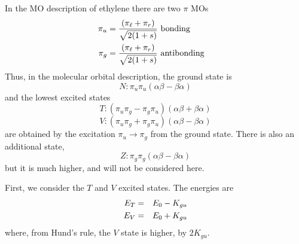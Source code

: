 In the MO description of ethylene there are two 
$\pi$ MOs
\begin{eqnarray}
\pi_u &= {(\pi_{\ell} + \pi_r) \over \sqrt{2(1+s)}}  ~{\rm bonding}\cr
\pi_g &= {(\pi_{\ell} + \pi_r) \over \sqrt{2(1+s)}}  ~{\rm antibonding}
\label{chap07-eqno19}
\end{eqnarray}
Thus, in the molecular orbital description, the ground state is
\begin{equation}
N : \pi_u \pi_u \left( \alpha \beta - \beta \alpha \right)
\label{chap07-eqno20}
\end{equation}
and the lowest excited states
\begin{equation}
T : \left( \pi_u \pi_g - \pi_g \pi_u \right) \left( \alpha \beta + 
\beta \alpha \right)
\label{chap07-eqno21}
\end{equation}
\begin{equation}
V : \left( \pi_u \pi_g + \pi_g \pi_u \right) \left( \alpha \beta - 
\beta \alpha \right)
\label{chap07-eqno22}
\end{equation}
are obtained by the excitation $\pi_u \rightarrow \pi_g$ from the 
ground state.  There is also an additional state,
\begin{equation}
Z : \pi_g \pi_g \left( \alpha \beta-\beta \alpha \right)
\end{equation}
but it is much higher, and will not be considered here.

First, we consider the $T$ and $V$ excited states. The energies are
\begin{eqnarray}
E_T &=& E_0 - K_{gu}\cr
E_V &=& E_0 + K_{gu}
\label{chap07-eqno23}
\end{eqnarray}
where, from Hund's rule, the $V$ state is higher, by $2K_{gu}$.

